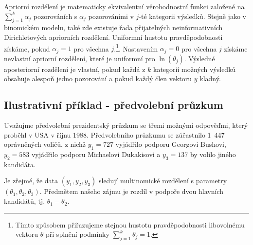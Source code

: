Apriorní rozdělení je matematicky ekvivalentní věrohodnostní funkci založené na $\sum_{j = 1}^k \alpha_j$ pozorováních s $\alpha_j$ pozorováními v $j$-té kategorii výsledků. Stejně jako v binomickém modelu, také zde existuje řada přijatelných neinformativních Dirichletových apriorních rozdělení. Uniformní hustotu pravděpodobnosti získáme, pokud $\alpha_j = 1$ pro všechna $j$.\footnote{Tímto způsobem přiřazujeme stejnou hustotu pravděpodobnosti libovolnému vektoru $\theta$ při splnění podmínky $\sum_{j = 1}^k \theta_j = 1$.}. Nastavením $\alpha_j = 0$ pro všechna $j$ získáme nevlastní apriorní rozdělení, které je uniformní pro $\ln(\theta_j)$. Výsledné aposteriorní rozdělení je vlastní, pokud každá z $k$ kategorií možných výsledků obsahuje alespoň jedno pozorování a pokud každý člen vektoru $y$ kladný.

\subsection{Ilustrativní příklad - předvolební průzkum}

Uvažujme předvolební prezidentský průzkum se třemi možnými odpověďmi, který proběhl v USA v říjnu 1988. Předvolebního průzkumu se zúčastnilo 1~447 oprávněných voličů, z nichž $y_1 = 727$ vyjádřilo podporu Georgovi Bushovi, $y_2 = 583$ vyjádřilo podporu Michaelovi Dukakisovi a $y_3 = 137$ by volilo jiného kandidáta.

Je zřejmé, že data $(y_1, y_2, y_3)$ sledují multinomické rozdělení s parametry $(\theta_1, \theta_2, \theta_3)$. Předmětem našeho zájmu je rozdíl v podpoře dvou hlavních kandidátů, tj. $\theta_1 - \theta_2$.

